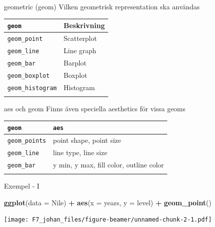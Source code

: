 \documentclass[
  11pt,
  ignorenonframetext,
  handout]{beamer}
\newenvironment{Shaded}{\begin{snugshade}}{\end{snugshade}}
\newcommand{\AttributeTok}[1]{\textcolor[rgb]{0.13,0.29,0.53}{#1}}
\newcommand{\FunctionTok}[1]{\textcolor[rgb]{0.13,0.29,0.53}{\textbf{#1}}}
\newcommand{\NormalTok}[1]{#1}
\newcommand{\SpecialCharTok}[1]{\textcolor[rgb]{0.81,0.36,0.00}{\textbf{#1}}}
\begin{document}
\begin{frame}[fragile]{geometric (geom)}
\label{geometric-geom}
Vilken geometrisk representation ska användas

\begin{longtable}[]{@{}ll@{}}
\toprule\noalign{}
\texttt{geom} & Beskrivning \\
\midrule\noalign{}
\endhead
\texttt{geom\_point} & Scatterplot \\
\texttt{geom\_line} & Line graph \\
\texttt{geom\_bar} & Barplot \\
\texttt{geom\_boxplot} & Boxplot \\
\texttt{geom\_histogram} & Histogram \\
\bottomrule\noalign{}
\end{longtable}
\end{frame}

\begin{frame}[fragile]{aes och geom}
\label{aes-och-geom}
Finns även speciella aesthetics för vissa geoms

\begin{longtable}[]{@{}ll@{}}
\toprule\noalign{}
\texttt{geom} & \texttt{aes} \\
\midrule\noalign{}
\endhead
\texttt{geom\_points} & point shape, point size \\
\texttt{geom\_line} & line type, line size \\
\texttt{geom\_bar} & y min, y max, fill color, outline color \\
\bottomrule\noalign{}
\end{longtable}
\end{frame}

\begin{frame}[fragile]{Exempel - I}
\label{exempel---i}
\begin{Shaded}
\begin{Highlighting}[]
\FunctionTok{ggplot}\NormalTok{(}\AttributeTok{data =}\NormalTok{ Nile) }\SpecialCharTok{+} 
  \FunctionTok{aes}\NormalTok{(}\AttributeTok{x =}\NormalTok{ years, }\AttributeTok{y =}\NormalTok{ level) }\SpecialCharTok{+} 
  \FunctionTok{geom\_point}\NormalTok{()}
\end{Highlighting}
\end{Shaded}

\texttt{[image: F7\_johan\_files/figure-beamer/unnamed-chunk-2-1.pdf]}
\end{frame}
\end{document}
